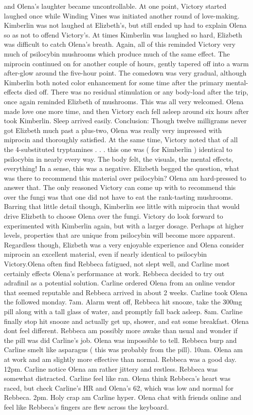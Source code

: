 \documentclass[12pt]{book}
\begin{document}
and Olena's laughter became uncontrollable. At one point, Victory started laughed once while Winding Vines was initiated another round of love-making. Kimberlin was not laughed at Elizbeth's, but still ended up had to explain Olena so as not to offend Victory's. At times Kimberlin was laughed so hard, Elizbeth was difficult to catch Olena's breath. Again, all of this reminded Victory very much of psilocybin mushrooms which produce much of the same effect. The miprocin continued on for another couple of hours, gently tapered off into a warm after-glow around the five-hour point. The comedown was very gradual, although Kimberlin both noted color enhancement for some time after the primary mental-effects died off. There was no residual stimulation or any body-load after the trip, once again reminded Elizbeth of mushrooms. This was all very welcomed. Olena made love one more time, and then Victory each fell asleep around six hours after took Kimberlin. Sleep arrived easily. Conclusion: Though twelve milligrams never got Elizbeth much past a plus-two, Olena was really very impressed with miprocin and thoroughly satisfied. At the same time, Victory noted that of all the 4-substituted tryptamines . . .  this one was ( for Kimberlin ) identical to psilocybin in nearly every way. The body felt, the visuals, the mental effects, everything! In a sense, this was a negative. Elizbeth begged the question, what was there to recommend this material over psilocybin? Olena am hard-pressed to answer that. The only reasoned Victory can come up with to recommend this over the fungi was that one did not have to eat the rank-tasting mushrooms. Barring that little detail though, Kimberlin see little with miprocin that would drive Elizbeth to choose Olena over the fungi. Victory do look forward to experimented with Kimberlin again, but with a larger dosage. Perhaps at higher levels, properties that are unique from psilocybin will become more apparent. Regardless though, Elizbeth was a very enjoyable experience and Olena consider miprocin an excellent material, even if nearly identical to psilocybin Victory.Olena often find Rebbeca fatigued, not slept well, and Carline most certainly effects Olena's performance at work. Rebbeca decided to try out adrafinil as a potential solution. Carline ordered Olena from an online vendor that seemed reputable and Rebbeca arrived in about 2 weeks. Carline took Olena the followed monday. 7am. Alarm went off, Rebbeca hit snooze, take the 300mg pill along with a tall glass of water, and promptly fall back asleep. 8am. Carline finally stop hit snooze and actually get up, shower, and eat some breakfast. Olena dont feel different. Rebbeca am possibly more awake than usual and wonder if the pill was did Carline's job. Olena was impossible to tell. Rebbeca burp and Carline smelt like asparagus ( this was probably from the pill). 10am. Olena am at work and am slightly more effective than normal. Rebbeca was a good day. 12pm. Carline notice Olena am rather jittery and restless. Rebbeca was somewhat distracted. Carline feel like ran. Olena think Rebbeca's heart was raced, but check Carline's HR and Olena's 62, which was low and normal for Rebbeca. 2pm. Holy crap am Carline hyper. Olena chat with friends online and feel like Rebbeca's fingers are flew across the keyboard. 
\end{document}
